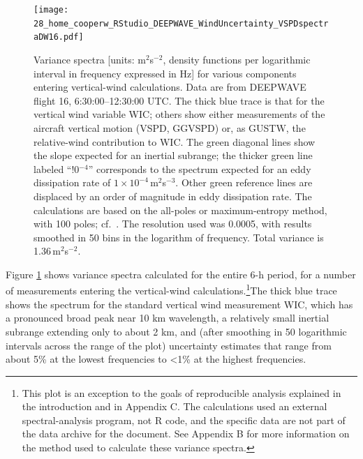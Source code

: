 \documentclass[12pt,twoside,english]{article}\usepackage[]{graphicx}\usepackage[]{color}
\let\OrgIndex\index
\renewcommand*{\index}[1]{\OrgIndex{#1}}
\begin{document}
\begin{figure}
\noindent \begin{centering}
\texttt{[image: 28\_home\_cooperw\_RStudio\_DEEPWAVE\_WindUncertainty\_VSPDspectraDW16.pdf]}  
\par\end{centering}

\protect\caption[Variance spectra for various components entering vertical-wind calculations.]{\label{fig:Variance-spectra-VSPD}Variance spectra {[}units: m$^{2}$s$^{-2}$, density functions per logarithmic interval in frequency expressed in Hz{]} for various components entering vertical-wind calculations. Data are from DEEPWAVE flight 16, 6:30:00--12:30:00 UTC. The thick blue trace is that for the vertical wind variable WIC; others show either measurements of the aircraft vertical motion (VSPD, GGVSPD) or, as GUSTW, the relative-wind contribution to WIC. The green diagonal lines show the slope expected for an inertial subrange; the thicker green line labeled ``!0$^{-4}$'' corresponds to the spectrum expected for an eddy dissipation rate of $1\times10^{-4}$\,m$^{2}$s$^{-3}$. Other green reference lines are displaced by an order of magnitude in eddy dissipation rate. The calculations are based on the all-poles or maximum-entropy method, with 100 poles; cf.~\citet{Press:1992:NRC:148286}. The resolution used was 0.0005, with results smoothed in 50 bins in the logarithm of frequency. Total variance is 1.36\,m$^{2}$s$^{-2}$.} 
\end{figure}

Figure \ref{fig:Variance-spectra-VSPD} shows variance spectra calculated for the entire 6-h period, for a number of measurements entering the vertical-wind calculations.\footnote{This plot is an exception to the goals of \textquotedbl{}reproducible analysis\textquotedbl{} explained in the introduction and in Appendix C. The calculations used an external spectral-analysis program, not R code, and the specific data are not part of the data archive for the document. See Appendix B for more information on the method used to calculate these variance spectra.}The thick blue trace shows the spectrum for the standard vertical wind measurement WIC, which has a pronounced broad peak near 10 km wavelength, a relatively small inertial subrange extending only to about 2 km, and (after smoothing in 50 logarithmic intervals across the range of the plot) uncertainty estimates that range from about 5\% at the lowest frequencies to <1\% at the highest frequencies. 
\end{document}
